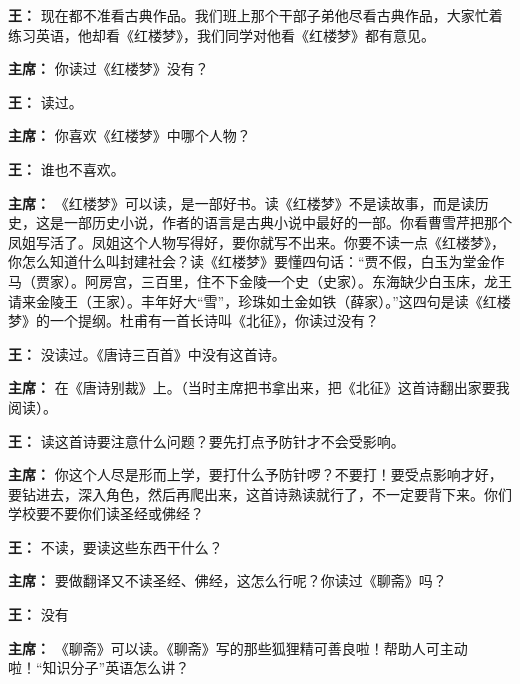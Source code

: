 \begin{duihua}

\item[\textbf{王：}] 现在都不准看古典作品。我们班上那个干部子弟他尽看古典作品，大家忙着练习英语，他却看《红楼梦》，我们同学对他看《红楼梦》都有意见。

\item[\textbf{主席：}] 你读过《红楼梦》没有？

\item[\textbf{王：}] 读过。

\item[\textbf{主席：}] 你喜欢《红楼梦》中哪个人物？

\item[\textbf{王：}] 谁也不喜欢。

\item[\textbf{主席：}] 《红楼梦》可以读，是一部好书。读《红楼梦》不是读故事，而是读历史，这是一部历史小说，作者的语言是古典小说中最好的一部。你看曹雪芹把那个凤姐写活了。凤姐这个人物写得好，要你就写不出来。你要不读一点《红楼梦》，你怎么知道什么叫封建社会？读《红楼梦》要懂四句话：“贾不假，白玉为堂金作马（贾家）。阿房宫，三百里，住不下金陵一个史（史家）。东海缺少白玉床，龙王请来金陵王（王家）。丰年好大“雪”，珍珠如土金如铁（薛家）。”这四句是读《红楼梦》的一个提纲。杜甫有一首长诗叫《北征》，你读过没有？

\item[\textbf{王：}] 没读过。《唐诗三百首》中没有这首诗。

\item[\textbf{主席：}] 在《唐诗别裁》上。（当时主席把书拿出来，把《北征》这首诗翻出家要我阅读）。

\item[\textbf{王：}] 读这首诗要注意什么问题？要先打点予防针才不会受影响。

\item[\textbf{主席：}] 你这个人尽是形而上学，要打什么予防针啰？不要打！要受点影响才好，要钻进去，深入角色，然后再爬出来，这首诗熟读就行了，不一定要背下来。你们学校要不要你们读圣经或佛经？

\item[\textbf{王：}] 不读，要读这些东西干什么？

\item[\textbf{主席：}] 要做翻译又不读圣经、佛经，这怎么行呢？你读过《聊斋》吗？

\item[\textbf{王：}] 没有

\item[\textbf{主席：}] 《聊斋》可以读。《聊斋》写的那些狐狸精可善良啦！帮助人可主动啦！“知识分子”英语怎么讲？


\end{duihua}
